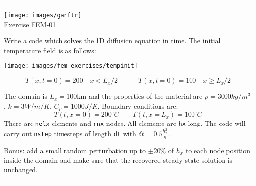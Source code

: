 \begin{center}
\begin{minipage}[t]{0.77\textwidth}
\par\noindent\rule{\textwidth}{0.4pt}

\begin{center}
\texttt{[image: images/garftr]} \\
{\color{orange}Exercise FEM-01}
\end{center}

Write a code which solves the 1D diffusion equation in time. 
The initial temperature field is as follows:
\begin{center}
\texttt{[image: images/fem\_exercises/tempinit]}
\end{center}
\[
T(x,t=0)=200 \quad x<L_x/2
\quad\quad\quad
T(x,t=0)=100 \quad x\geq L_x/2
\]

The domain is $L_x=100$km and the properties of the material are 
$\rho=3000kg/m^3$, $k=3W/m/K$, $C_p=1000J/K$.
Boundary conditions are:
\[
T(t,x=0)=200^\circ C
\quad\quad
T(t,x=L_x)=100^\circ C
\]
There are {\tt nelx} elements and {\tt nnx} nodes.
All elements are {\tt hx} long.
The code will carry out {\tt nstep} timesteps of length {\tt dt}
with 
$\delta t = 0.5 \frac{h^2_x}{\kappa}$.

Bonus: add a small random perturbation up to $\pm$20\% of $h_x$ to each node position 
inside the domain and make sure that the recovered steady state solution is unchanged.

\par\noindent\rule{\textwidth}{0.4pt}
\end{minipage}
\end{center}

